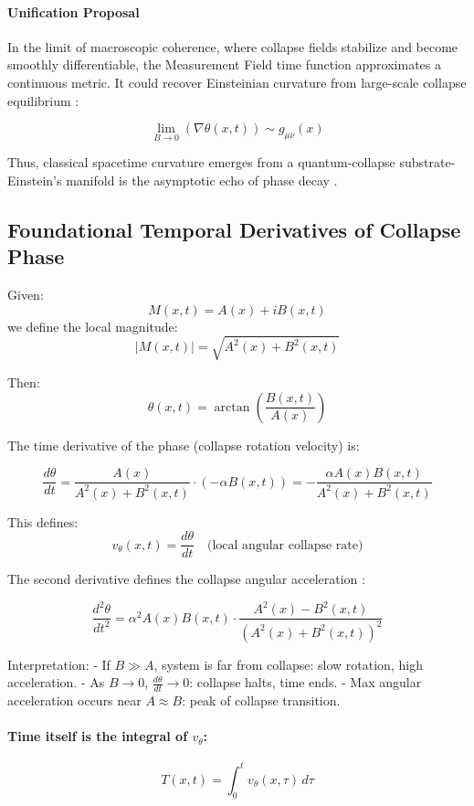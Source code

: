 \paragraph{Unification Proposal}

In the limit of macroscopic coherence, where collapse fields stabilize and become smoothly differentiable, the Measurement Field time function approximates a continuous metric. \cite{chapter_time} It could recover Einsteinian curvature from  large-scale collapse equilibrium :

\[
\lim_{B \to 0} \left( \nabla \theta(x,t) \right) \sim g_{\mu\nu}(x)
\]

Thus, classical spacetime curvature emerges from a quantum-collapse substrate- Einstein’s manifold is the asymptotic echo of phase decay . \cite{chapter_time} \subsection*{Foundational Temporal Derivatives of Collapse Phase}

Given:
\[
M(x, t) = A(x) + i B(x, t)
\]
we define the local magnitude:
\[
|M(x, t)| = \sqrt{A^2(x) + B^2(x, t)}
\]

Then:
\[
\theta(x, t) = \arctan\left( \frac{B(x, t)}{A(x)} \right)
\]

The time derivative of the phase (collapse rotation velocity) is:

\[
\frac{d\theta}{dt} = \frac{A(x)}{A^2(x) + B^2(x, t)} \cdot \left(-\alpha B(x, t)\right) = -\frac{\alpha A(x) B(x, t)}{A^2(x) + B^2(x, t)}
\]

This defines:
\[
v_\theta(x, t) = \frac{d\theta}{dt}
\quad \text{(local angular collapse rate)}
\]

The second derivative defines the collapse  angular acceleration :

\[
\frac{d^2 \theta}{dt^2} = \alpha^2 A(x) B(x, t) \cdot \frac{A^2(x) - B^2(x, t)}{(A^2(x) + B^2(x, t))^2}
\]

Interpretation:
- If $B \gg A$, system is far from collapse: slow rotation, high acceleration.
- As $B \to 0$, $\frac{d\theta}{dt} \to 0$: collapse halts, time ends.
- Max angular acceleration occurs near $A \approx B$: peak of collapse transition. \cite{chapter_time} \paragraph{Time itself is the integral of $v_\theta$:}

\[
T(x, t) = \int_0^t v_\theta(x, \tau) \, d\tau
\]

